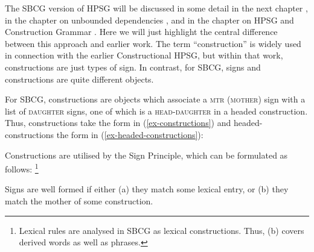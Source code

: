 \documentclass[output=paper,biblatex,babelshorthands,newtxmath,draftmode,colorlinks,citecolor=brown]{langscibook}
\begin{document}
The SBCG version of HPSG will be discussed in some detail in the next chapter
\citep*[\page~]{chapters/evolution}, in the chapter on
unbounded dependencies \citep[Section~\ref{udc:sec-SBCG}]{chapters/udc}, and in the chapter on HPSG and
Construction Grammar \citep[Section~\ref{cxg:sec-sbcg}]{chapters/cxg}. Here we will just highlight
the central difference between this approach and earlier work. The term ``construction'' is widely
used in connection with the earlier Constructional HPSG, but within that work, constructions are
just types of sign. In contrast, for SBCG, signs and constructions are quite different objects. 

For SBCG, constructions are objects which associate a \textsc{mtr} (\textsc{mother}) sign with a
list of \textsc{daughter} signs, one of which is a \textsc{head-daughter} in a headed
construction. Thus, constructions take the form in (\ref{ex-constructions}) and headed-constructions
the form in (\ref{ex-headed-constructions}): 

\eal\label{ex:prop48}
\ex\label{ex:prop48a}\label{ex-constructions}
	
	
\ex\label{ex:prop48b}\label{ex-headed-constructions}
\zl

\noindent
Constructions are utilised by the Sign Principle, which can be formulated as follows:%
%
\footnote{Lexical rules are analysed in SBCG as lexical constructions. Thus, (b) covers derived words as well as phrases.}
%

\eanoraggedright
\label{ex:prop49}
Signs are well formed if either (a) they match some lexical entry, or (b) they match the mother of some construction.
\z
\end{document}

